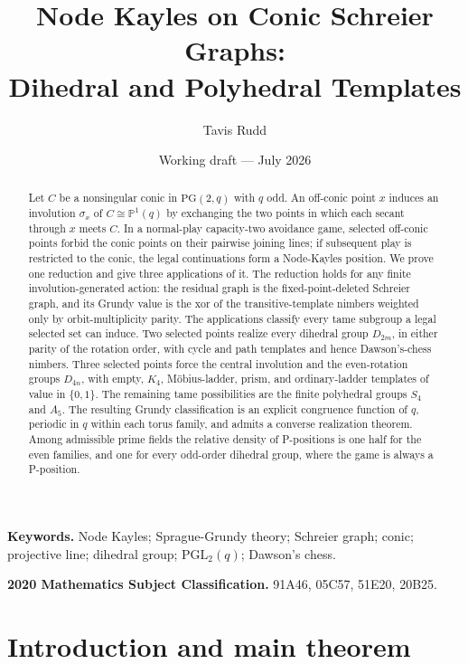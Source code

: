 \documentclass[11pt]{article}
\title{Node Kayles on Conic Schreier Graphs:\\
Dihedral and Polyhedral Templates}
\author{Tavis Rudd}
\date{Working draft --- July 2026}
\theoremstyle{definition}
\theoremstyle{remark}
\newcommand{\PG}{\mathrm{PG}}
\newcommand{\PGL}{\mathrm{PGL}}
\newcommand{\PP}{\mathbb{P}}
\newif\ifdraftnotes
\newcommand{\phasenote}[2]{%
  \ifdraftnotes
    \par\smallskip\noindent
    \fbox{\parbox{0.96\linewidth}{\footnotesize\textbf{[#1 owed]}\ #2}}%
    \par\smallskip
  \fi}
\begin{document}
\maketitle

\begin{abstract}
Let $C$ be a nonsingular conic in $\PG(2,q)$ with $q$ odd. An off-conic point $x$ induces an
involution $\sigma_x$ of $C\cong\PP^1(q)$ by exchanging the two points in which each secant
through $x$ meets $C$. In a normal-play capacity-two avoidance game, selected off-conic points
forbid the conic points on their pairwise joining lines; if subsequent play is restricted to the
conic, the legal continuations form a Node-Kayles position. We prove one reduction and give three
applications of it. The reduction holds for any finite involution-generated action: the residual
graph is the fixed-point-deleted Schreier graph, and its Grundy value is the xor of the
transitive-template nimbers weighted only by orbit-multiplicity parity. The applications classify
every tame subgroup a legal selected set can induce. Two selected points realize every dihedral
group $D_{2m}$, in either parity of the rotation order, with cycle and path templates and hence
Dawson's-chess nimbers. Three selected points force the central involution and the even-rotation
groups $D_{4n}$, with empty, $K_4$, Möbius-ladder, prism, and ordinary-ladder templates of value in
$\{0,1\}$. The remaining tame possibilities are the finite polyhedral groups $S_4$ and $A_5$. The
resulting Grundy classification is an explicit congruence function of $q$, periodic in $q$ within
each torus family, and admits a converse realization theorem. Among admissible prime fields the
relative density of P-positions is one half for the even families, and one for every odd-order
dihedral group, where the game is always a P-position.
\end{abstract}

\noindent\textbf{Keywords.} Node Kayles; Sprague-Grundy theory; Schreier graph; conic; projective
line; dihedral group; $\PGL_2(q)$; Dawson's chess.

\smallskip
\noindent\textbf{2020 Mathematics Subject Classification.} 91A46, 05C57, 51E20, 20B25.

\phasenote{C308}{Keyword list, MSC codes, and the novelty calibration of the abstract are
C308 deliverables; the entries above are placeholders inherited from the source manuscript's
subject matter.}

\section{Introduction and main theorem}
\label{sec:intro}
\end{document}
